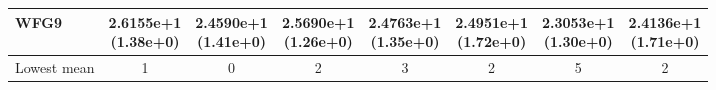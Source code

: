 \begin{table}[p]
\begin{tabular}{lccccccc}
WFG9 & \shortstack{2.6155e+1\\(1.38e+0)} & \shortstack{2.4590e+1\\(1.41e+0)} & \shortstack{2.5690e+1\\(1.26e+0)} & \shortstack{2.4763e+1\\(1.35e+0)} & \shortstack{2.4951e+1\\(1.72e+0)} & \shortstack{\textbf{2.3053e+1}\\(1.30e+0)} & \shortstack{2.4136e+1\\(1.71e+0)} \\
\midrule
Lowest mean & 1 & 0 & 2 & 3 & 2 & 5 & 2 \\
\bottomrule
\end{tabular}
\end{table}

